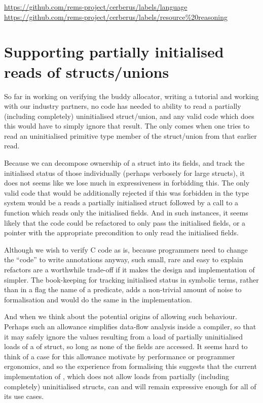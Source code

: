 \url{https://github.com/rems-project/cerberus/labels/language}
\url{https://github.com/rems-project/cerberus/labels/resource\%20reasoning}

\section{Supporting partially initialised reads of structs/unions}\label{sec:partial-init-structs}

So far in working on verifying the buddy allocator, writing a tutorial and
working with our industry partners, no code has needed to ability to read a
partially (including completely) uninitialised struct/union, and any valid code
which does this would have to simply ignore that result. The  only comes
when one tries to read an uninitialised primitive type member of the
struct/union from that earlier read.

Because we can decompose ownership of a struct into its fields, and track the
initialised status of those individually (perhaps verbosely for large structs),
it does not seems like we lose much in expressiveness in forbidding this. The
only valid code that would be additionally rejected if this was forbidden in
the type system would be a reads a partially initialised struct followed by a
call to a function which reads only the initialised fields. And in such
instances, it seems likely that the code could be refactored to only pass the
initialised fields, or a pointer with the appropriate precondition to only read
the initialised fields.

Although we wish to verify C code as is, because programmers need to change the
``code'' to write annotations anyway, such small, rare and easy to explain
refactors are a worthwhile trade-off if it makes the design and implementation
of  simpler. The book-keeping for tracking initialised status in
symbolic terms, rather than in a flag the name of a predicate, adds a
non-trivial amount of noise to formalisation and would do the same in the
implementation.

And when we think about the potential origins of allowing such behaviour.
Perhaps such an allowance simplifies data-flow analysis inside a compiler, so
that it may safely ignore the values resulting from a load of partially
uninitialised loads of a of struct, so long as none of the fields are accessed.
It seems hard to think of a case for this allowance motivate by performance or
programmer ergonomics, and so the experience from formalising this suggests
that the current implementation of , which does not allow loads from
partially (including completely) uninitialised structs, can and will remain
expressive enough for all of its use cases.

